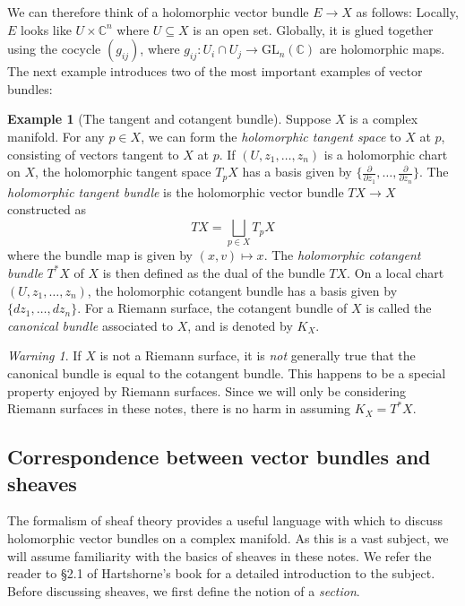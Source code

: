 \documentclass[10pt]{amsart}
\numberwithin{equation}{section}
\newcommand{\C}{\mathbb{C}}
\newcommand{\GL}{\mathrm{GL}}
\theoremstyle{plain}
\theoremstyle{definition}
\newtheorem{ex}[thm]{Example}
\theoremstyle{remark}
\newtheorem*{warn}{Warning}
\begin{document}
We can therefore think of a holomorphic vector bundle $E \to X$ as follows: Locally, $E$ looks like $U \times \C^n$ where $U \subseteq X$ is an open set. Globally, it is glued together using the cocycle $(g_{ij})$, where $g_{ij}: U_i \cap U_j \to \GL_n(\C)$ are holomorphic maps. The next example introduces two of the most important examples of vector bundles:
\begin{ex}[The tangent and cotangent bundle]
    Suppose $X$ is a complex manifold. For any $p \in X$, we can form the \emph{holomorphic tangent space} to $X$ at $p$, consisting of vectors tangent to $X$ at $p$. If $(U, z_1, \hdots, z_n)$ is a holomorphic chart on $X$, the holomorphic tangent space $T_pX$ has a basis given by $\{\frac{\partial}{\partial z_1}, \hdots, \frac{\partial}{\partial z_n}\}$. The \emph{holomorphic tangent bundle} is the holomorphic vector bundle $TX \to X$ constructed as
    \[TX = \bigsqcup_{p \in X} T_p X\]
    where the bundle map is given by $(x, v) \mapsto x$. The \emph{holomorphic cotangent bundle} $T^*X$ of $X$ is then defined as the dual of the bundle $TX$. On a local chart $(U, z_1, \hdots, z_n)$, the holomorphic cotangent bundle has a basis given by $\{dz_1, \hdots, dz_n\}$. For a Riemann surface, the cotangent bundle of $X$ is called the \emph{canonical bundle} associated to $X$, and is denoted by $K_X$. 
\end{ex}

\begin{warn}
    If $X$ is not a Riemann surface, it is \emph{not} generally true that the canonical bundle is equal to the cotangent bundle. This happens to be a special property enjoyed by Riemann surfaces. Since we will only be considering Riemann surfaces in these notes, there is no harm in assuming $K_X = T^*X$.
\end{warn}

\subsection{Correspondence between vector bundles and sheaves}
The formalism of sheaf theory provides a useful language with which to discuss holomorphic vector bundles on a complex manifold. As this is a vast subject, we will assume familiarity with the basics of sheaves in these notes. We refer the reader to \S 2.1 of Hartshorne's book \cite{hartshorne} for a detailed introduction to the subject. Before discussing sheaves, we first define the notion of a \emph{section}.
\end{document}
